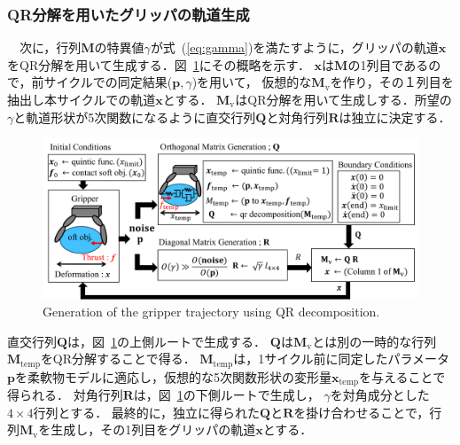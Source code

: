 \documentclass[a4paper]{jarticle}
\begin{document}
\subsubsection{QR分解を用いたグリッパの軌道生成}
\label{subsubsec:QR_traj_gen}
　次に，行列$\mathbf{M}$の特異値$\gamma$が式~(\ref{eq:gamma})を満たすように，グリッパの軌道$\boldsymbol{x}$をQR分解を用いて生成する．図~{\ref{fig:QR_traj}}にその概略を示す．
$\boldsymbol{x}$は$\mathbf{M}$の1列目であるので，前サイクルでの同定結果($\mathbf{p},\gamma$)を用いて，
仮想的な$\mathbf{M}_{\mathrm{v}}$を作り，その１列目を抽出し本サイクルでの軌道$\boldsymbol{x}$とする．
$\mathbf{M_{\mathrm{v}}}$はQR分解を用いて生成しする．所望の$\gamma$と軌道形状が5次関数になるように直交行列$\mathbf{Q}$と対角行列$\mathbf{R}$は独立に決定する．
\begin{figure}[tb]
    \centering
    \includegraphics[width=1\textwidth]{QR_traj_eng.pdf}
    \captionsetup{width=0.9\linewidth} %
    \caption{Generation of the gripper trajectory using QR decomposition.}
    \label{fig:QR_traj}
\end{figure}
直交行列$\mathbf{Q}$は，図~\ref{fig:QR_traj}の上側ルートで生成する．
$\mathbf{Q}$は$\mathbf{M}_{\mathrm{v}}$とは別の一時的な行列$\mathbf{M}_{\mathrm{temp}}$をQR分解することで得る．
$\mathbf{M}_{\mathrm{temp}}$は，1サイクル前に同定したパラメータ$\mathbf{p}$を柔軟物モデルに適応し，仮想的な5次関数形状の変形量$\boldsymbol{x}_{\mathrm{temp}}$を与えることで得られる．
対角行列$\mathbf{R}$は，図~\ref{fig:QR_traj}の下側ルートで生成し，
$\gamma$を対角成分とした$4\times4$行列とする．
最終的に，独立に得られた$\mathbf{Q}$と$\mathbf{R}$を掛け合わせることで，行列$\mathbf{M_{\mathrm{v}}}$を生成し，その1列目をグリッパの軌道$\boldsymbol{x}$とする．
\end{document}
